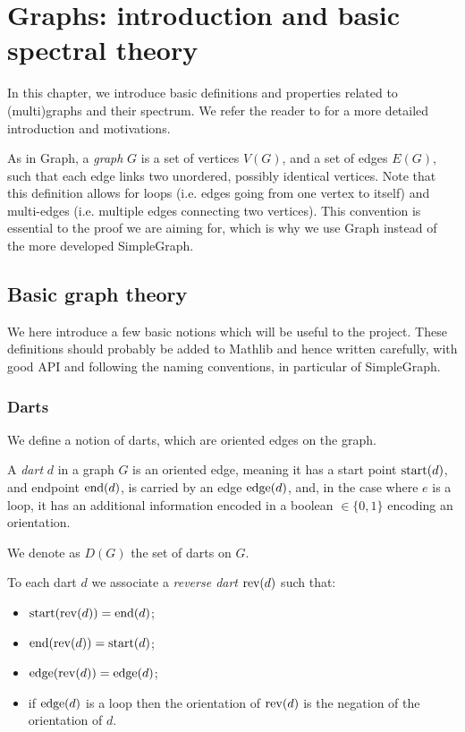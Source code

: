 \chapter{Graphs: introduction and basic spectral theory}

In this chapter, we introduce basic definitions and properties
related to (multi)graphs and their spectrum.
We refer the reader to \cite{chung1992} for a more detailed introduction and motivations.

As in Graph, a \emph{graph} $G$ is a set of vertices $V(G)$, and
a set of edges $E(G)$, such that each edge links two unordered, possibly identical vertices.
Note that this definition allows for loops (i.e. edges going from one vertex to itself) and
multi-edges (i.e. multiple edges connecting two vertices). This convention is essential to the proof
we are aiming for, which is why we use Graph instead of the more developed
SimpleGraph.

\section{Basic graph theory}

We here introduce a few basic notions which will be useful to the project.
These definitions should probably be added to Mathlib and hence written carefully,
with good API and following the naming conventions, in particular of SimpleGraph.

\subsection{Darts}

We define a notion of darts, which are oriented edges on the graph.


\begin{definition}
  \label{def:dart}
  \leanok
  A \emph{dart} $d$ in a graph $G$ is an oriented edge, meaning it has a start point
  $\mathrm{start}(d)$, and endpoint $\mathrm{end}(d)$, is carried by an edge $\mathrm{edge}(d)$, and, in the
  case where $e$ is a loop, it has an additional information encoded in a boolean
  $\in \{0, 1\}$ encoding an orientation.

  We denote as $D(G)$ the set of darts on $G$.
\end{definition}

\begin{definition}
  \label{def:reverse_dart}
  \leanok
  To each dart $d$ we associate a \emph{reverse dart} $\mathrm{rev}(d)$ such that:
  \begin{itemize}
    \item $\mathrm{start}(\mathrm{rev}(d)) = \mathrm{end}(d)$;
    \item $\mathrm{end}(\mathrm{rev}(d)) = \mathrm{start}(d)$;
    \item $\mathrm{edge}(\mathrm{rev}(d)) = \mathrm{edge}(d)$;
    \item if $\mathrm{edge}(d)$ is a loop then the orientation of $\mathrm{rev}(d)$ is
    the negation of the orientation of $d$.
  \end{itemize}
\end{definition}

